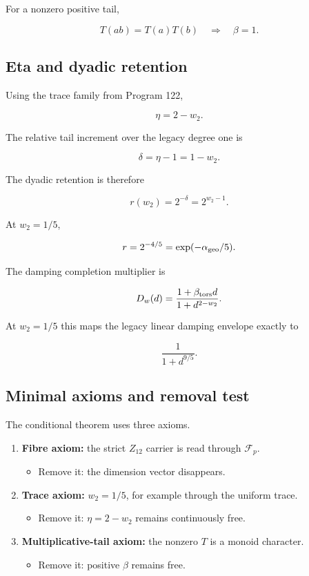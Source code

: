 \documentclass[11pt,a4paper,openany]{report}
\begin{document}
For a nonzero positive tail,

\[
T(ab)=T(a)T(b)
\quad\Longrightarrow\quad
\beta=1.
\]

\subsection{Eta and dyadic retention}

Using the trace family from Program 122,

\[
\eta=2-w_2.
\]

The relative tail increment over the legacy degree one is

\[
\delta=\eta-1=1-w_2.
\]

The dyadic retention is therefore

\[
r(w_2)=2^{-\delta}=2^{w_2-1}.
\]

At \(w_2=1/5\),

\[
r=2^{-4/5}
=\exp(-\alpha_{\rm geo}/5).
\]

The damping completion multiplier is

\[
D_w(d)
=
\frac{1+\beta_{\rm tors}d}
{1+d^{2-w_2}}.
\]

At \(w_2=1/5\) this maps the legacy linear damping envelope exactly to

\[
\frac1{1+d^{9/5}}.
\]

\subsection{Minimal axioms and removal test}

The conditional theorem uses three axioms.

\begin{enumerate}
\item 
\textbf{Fibre axiom:} the strict \(Z_{12}\) carrier is read through \(\mathcal F_p\).

\begin{itemize}
\item 
Remove it: the dimension vector disappears.

\end{itemize}

\item 
\textbf{Trace axiom:} \(w_2=1/5\), for example through the uniform trace.

\begin{itemize}
\item 
Remove it: \(\eta=2-w_2\) remains continuously free.

\end{itemize}

\item 
\textbf{Multiplicative-tail axiom:} the nonzero \(T\) is a monoid character.

\begin{itemize}
\item 
Remove it: positive \(\beta\) remains free.

\end{itemize}

\end{enumerate}
\end{document}
